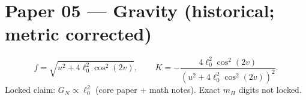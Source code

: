 \documentclass[11pt]{article}
\begin{document}
\section*{Paper 05 — Gravity (historical; metric corrected)}
\[
f=\sqrt{u^2+4\ell_0^2\cos^2(2v)},\qquad
K=-\frac{4\ell_0^2\cos^2(2v)}{(u^2+4\ell_0^2\cos^2(2v))^2}.
\]
Locked claim: $G_N\propto\ell_0^2$ (core paper + math notes). Exact $m_H$ digits not locked.
\end{document}
